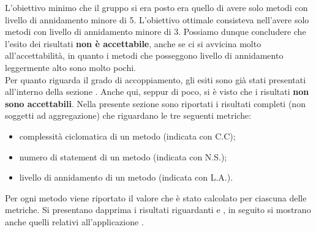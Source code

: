 				L'obiettivo minimo che il gruppo si era posto era quello di avere solo metodi con livello di annidamento minore di 5. L'obiettivo ottimale consisteva nell'avere solo metodi con livello di annidamento minore di 3. Possiamo dunque concludere che l'esito dei risultati \textbf{non è accettabile}, anche se ci si avvicina molto all'accettabilità, in quanto i metodi che posseggono livello di annidamento leggermente alto sono molto pochi.\\
				Per quanto riguarda il grado di accoppiamento, gli esiti sono già stati presentati all'interno della sezione . Anche qui, seppur di poco, si è visto che i risultati \textbf{non sono accettabili}.
				Nella presente sezione sono riportati i risultati completi (non soggetti ad aggregazione) che riguardano le tre seguenti metriche:
				\begin{itemize}
					\item complessità ciclomatica di un metodo (indicata con C.C);
					\item numero di statement di un metodo (indicata con N.S.);
					\item livello di annidamento di un metodo (indicata con L.A.).
				\end{itemize}
				Per ogni metodo viene riportato il valore che è stato calcolato per ciascuna delle metriche. Si presentano dapprima i risultati riguardanti  e , in seguito si mostrano anche quelli relativi all'applicazione .\\
				
				

